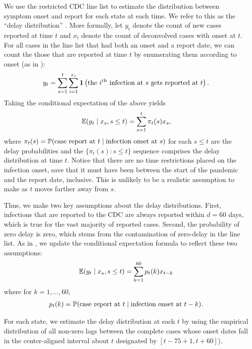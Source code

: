 \documentclass{article}
\begin{document}
We use the restricted CDC line list to estimate the distribution between symptom
onset and report for each state at each time. We refer to this as the ``delay
distribution'' \citep[see
\autoref{fig:cases_to_infect_flowchart} or][]{jahja2022real}. More formally, let
$y_t$ denote the count of new cases reported at time $t$ and $x_t$ denote the
count of deconvolved cases with onset at $t$. 
For all cases in the line list that had both an onset and a report date, 
we can count the those that are
reported at time $t$ by enumerating them according to onset (as in
\citealp{jahja2022real}):
\begin{align*}
y_t = \sum_{s=1}^{t} \sum_{i=1}^{x_s}\indicator \left ( \text{the }i\th\text{ infection at }
 s \text{ gets reported at }t \right ).
\end{align*}
Taking the conditional expectation of the above yields
\begin{align*}
\E(y_t \mid x_s, s \leq t) = \sum_{s=1}^{t} \pi_t(s) x_s ,
\end{align*}
where $\pi_t(s) = \P(\text{case report at }t \mid \text{infection onset at }s)$ for
each $s \leq t$ are the delay probabilities and the $\{ \pi_t(s) : s \leq t
\}$ sequence comprises the delay distribution at time $t$. Notice that
there are no time restrictions placed on the infection onset, save that it must
have been between the start of the pandemic and the report date, inclusive. This is
unlikely to be a realistic assumption to make as $t$ moves farther away from
$s$. 

Thus, we make two key assumptions about the delay distributions. First,
infections that are reported to the CDC are always reported within $d = 60$
days, which is true for the vast majority of reported cases. Second, the
probability of zero delay is zero, which stems from the contamination of
zero-delay in the line list. As in \citet{jahja2022real}, we update the
conditional expectation formula to reflect these two assumptions: 
\begin{align*}
\E(y_t \mid x_s, s \leq t) = \sum_{k=1}^{60} p_t(k) x_{t-k}
\end{align*}
where for $k = 1, \dots, 60$,
\begin{align*}
p_t(k) = \P(\text{case report at }t \mid \text{infection onset at }t-k).
\end{align*}

For each state, we estimate the delay distribution at each $t$ by using the empirical distribution of
all non-zero lags between the complete cases whose onset dates fall in the
center-aligned interval about $t$ designated by $[ t - 75 + 1, t + 60
]$). 
\end{document}
